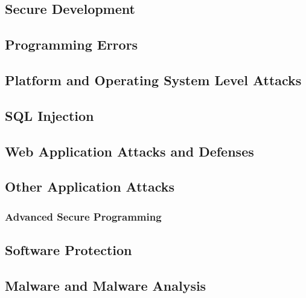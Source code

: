 \documentclass[9pt]{extarticle}
\begin{document}
  \begin{multicols}{2}
  \subsection*{Secure Development}
  

  \subsection*{Programming Errors}
  

  \subsection*{Platform and Operating System Level Attacks}
  

  \subsection*{SQL Injection}
  

  \subsection*{Web Application Attacks and Defenses}
  

  \subsection*{Other Application Attacks}
  

  \subsubsection*{Advanced Secure Programming}
  

  \subsection*{Software Protection}
  

  \subsection*{Malware and Malware Analysis}
  
  \end{multicols}
\end{document}
